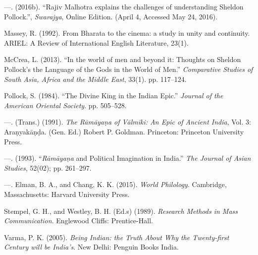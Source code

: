 \begin{thebibliography}{99}
  —. (2016b). “Rajiv Malhotra explains the challenges of understanding Sheldon Pollock.”, \textit{Swarajya}, Online Edition. (April 4, Accessed May 24, 2016).

  Massey, R. (1992). From Bharata to the cinema: a study in unity and continuity. ARIEL: A Review of International English Literature, 23(1).

  McCrea, L. (2013). “In the world of men and beyond it: Thoughts on Sheldon Pollock’s the Language of the Gods in the World of Men.” \textit{Comparative Studies of South Asia, Africa and the Middle East}, 33(1). pp. 117--124.

  Pollock, S. (1984). “The Divine King in the Indian Epic.” \textit{Journal of the American Oriental Society}. pp. 505--528.

  —. (Trans.) (1991). \textit{The Rāmāyaṇa of Vālmīki: An Epic of Ancient India}, Vol. 3: Araṇyakāṇḍa. (Gen. Ed.) Robert P. Goldman. Princeton: Princeton University Press.

  —. (1993). “\textit{Rāmāyaṇa} and Political Imagination in India.” \textit{The Journal of Asian Studies}, 52(02); pp. 261--297.

  —. Elman, B. A., and Chang, K. K. (2015). \textit{World Philology}. Cambridge, Massachusetts: Harvard University Press.

  Stempel, G. H., and Westley, B. H. (Ed.s) (1989). \textit{Research Methods in Mass Communication}. Englewood Cliffs: Prentice-Hall.

  Varma, P. K. (2005). \textit{Being Indian: the Truth About Why the Twenty-first Century will be India's}. New Delhi: Penguin Books India.

 \end{thebibliography}

\theendnotes

